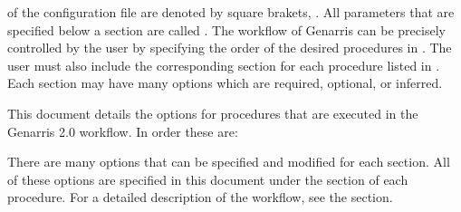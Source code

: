 \documentclass[letterpaper,10pt,english]{sphinxmanual}
\begin{document}
 of the configuration file are denoted by square brakets, \sphinxcode{\sphinxupquote{{[}...{]}}}.
All parameters that are specified below a section are called . The
workflow of Genarris can be precisely controlled by the user by specifying the
order of the desired procedures in . The user must also
include the corresponding section for each procedure listed in
. Each section may have many options which are required,
optional, or inferred.

This document details the options for procedures that are executed in the Genarris 2.0
 workflow. In order these are:

\begin{sphinxVerbatim}[commandchars=\\\{\}]
\PYG{p}{[}
 \PYG{p}{]}
\end{sphinxVerbatim}

There are many options that can be specified and modified for each section.
All of these options are specified in this document under the
 section of each procedure. For a detailed
description of the workflow, see the {\hyperref[\detokenize{index:detailed-instructions}]{}} section.
\end{document}

